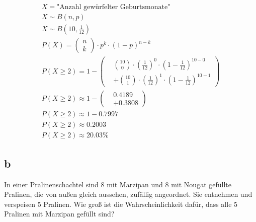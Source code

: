 \begin{align*}
    X = \text{"Anzahl gewürfelter Geburtsmonate"}          \\
    X \sim B\left(n, p\right)                              \\
    X \sim B\left(10, \frac{1}{12}\right)                  \\
    P(X) = \begin{pmatrix}
               n \\ k
           \end{pmatrix} \cdot p^k \cdot {(1 - p)}^{n - k} \\
    P(X \geq 2) = 1 - \left(
    \begin{aligned}
             & \binom{10}{0} \cdot {\left(\frac{1}{12}\right)}^0 \cdot {\left(1 - \frac{1}{12}\right)}^{10-0}   \\
             & + \binom{10}{1} \cdot {\left(\frac{1}{12}\right)}^1 \cdot {\left(1 - \frac{1}{12}\right)}^{10-1}
        \end{aligned}
    \right)                                                \\
    P(X \geq 2) \approx 1 - \left(
    \begin{aligned}
             & 0.4189   \\
             & + 0.3808
        \end{aligned}
    \right)                                                \\
    P(X \geq 2) \approx 1 - 0.7997                         \\
    P(X \geq 2) \approx 0.2003                             \\
    P(X \geq 2) \approx 20.03\%
\end{align*}

\subsection{b}

In einer Pralinenschachtel sind 8 mit Marzipan und 8 mit Nougat gefüllte
Pralinen, die von außen gleich aussehen, zufällig angeordnet. Sie entnehmen und
verspeisen 5 Pralinen. Wie groß ist die Wahrscheinlichkeit dafür, dass alle 5
Pralinen mit Marzipan gefüllt sind?

